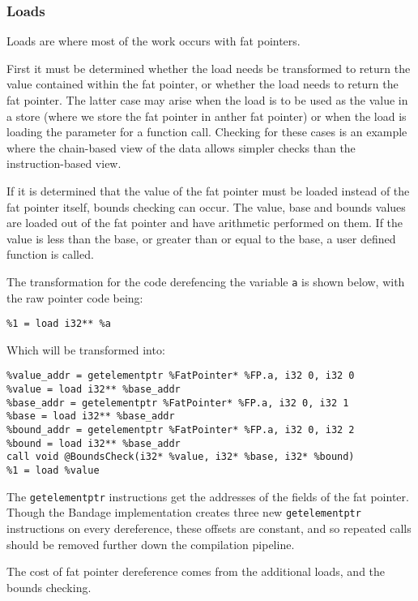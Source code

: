 \subsubsection{Loads}

Loads are where most of the work occurs with fat pointers.

First it must be determined whether the load needs be transformed to return the value contained within the fat pointer, or whether the load needs to return the fat pointer.
The latter case may arise when the load is to be used as the value in a store (where we store the fat pointer in anther fat pointer) or when the load is loading the parameter for a function call.
Checking for these cases is an example where the chain-based view of the data allows simpler checks than the instruction-based view.

If it is determined that the value of the fat pointer must be loaded instead of the fat pointer itself, bounds checking can occur.
The value, base and bounds values are loaded out of the fat pointer and have arithmetic performed on them.
If the value is less than the base, or greater than or equal to the base, a user defined function is called.

The transformation for the code derefencing the variable \verb!a! is shown below, with the raw pointer code being:

\begin{verbatim}
%1 = load i32** %a
\end{verbatim}

Which will be transformed into:

\begin{verbatim}
%value_addr = getelementptr %FatPointer* %FP.a, i32 0, i32 0
%value = load i32** %base_addr
%base_addr = getelementptr %FatPointer* %FP.a, i32 0, i32 1
%base = load i32** %base_addr
%bound_addr = getelementptr %FatPointer* %FP.a, i32 0, i32 2
%bound = load i32** %base_addr
call void @BoundsCheck(i32* %value, i32* %base, i32* %bound)
%1 = load %value
\end{verbatim}

The \verb!getelementptr! instructions get the addresses of the fields of the fat pointer.
Though the Bandage implementation creates three new \verb!getelementptr! instructions on every dereference, these offsets are constant, and so repeated calls should be removed further down the compilation pipeline.

The cost of fat pointer dereference comes from the additional loads, and the bounds checking.

